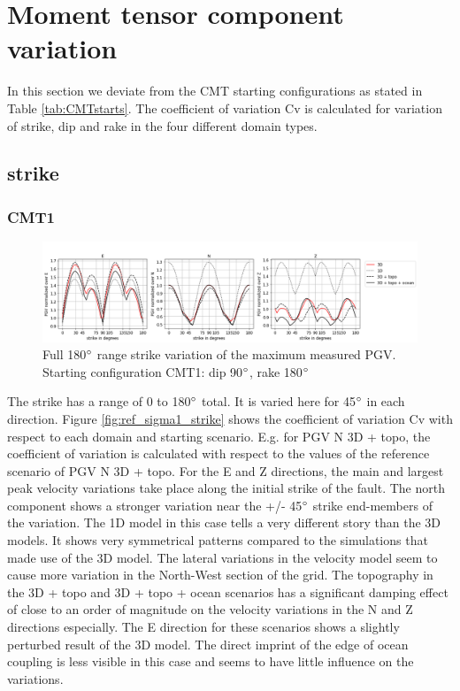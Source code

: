 \documentclass[../Text/00main.tex]{subfiles}
\begin{document}
\section{Moment tensor component variation}

In this section we deviate from the CMT starting configurations as stated in Table \ref{tab:CMTstarts}. The coefficient of variation $\text{Cv}$ is calculated for variation of strike, dip and rake in the four different domain types. 

\subsection{strike}

\subsubsection{CMT1}

\begin{figure}[!htb]
    \centering
    \includegraphics[width=\textwidth]{images_results/fullrange_strikevar_maxvals_sc1.png}
    \caption{Full 180$\degree$ range strike variation of the maximum measured PGV. Starting configuration CMT1: dip 90$\degree$, rake 180$\degree$}
    \label{fig:KAVV_fullrange_1}
\end{figure}

The strike has a range of 0 to 180$\degree$ total. It is varied here for 45$\degree$ in each direction. Figure \ref{fig:ref_sigma1_strike} shows the coefficient of variation $\text{Cv}$ with respect to each domain and starting scenario. E.g. for PGV N 3D + topo, the coefficient of variation is calculated with respect to the values of the reference scenario of PGV N 3D + topo. For the E and Z directions, the main and largest peak velocity variations take place along the initial strike of the fault. The north component shows a stronger variation near the +/- 45$\degree$ strike end-members of the variation. The 1D model in this case tells a very different story than the 3D models. It shows very symmetrical patterns compared to the simulations that made use of the 3D model. The lateral variations in the velocity model seem to cause more variation in the North-West section of the grid. The topography in the 3D + topo and 3D + topo + ocean scenarios has a significant damping effect of close to an order of magnitude on the velocity variations in the N and Z directions especially. The E direction for these scenarios shows a slightly perturbed result of the 3D model. The direct imprint of the edge of ocean coupling is less visible in this case and seems to have little influence on the variations. 
\end{document}
